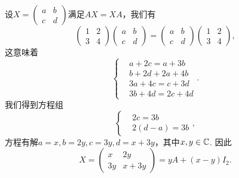 \begin{solution}
  设$X=\begin{pmatrix}
    a & b \\
    c & d
  \end{pmatrix}$满足$AX=XA$，我们有
  \[
    \begin{pmatrix}
      1 & 2 \\
      3 & 4
    \end{pmatrix}\begin{pmatrix}
      a & b \\
      c & d
    \end{pmatrix} = \begin{pmatrix}
      a & b \\
      c & d
    \end{pmatrix}\begin{pmatrix}
      1 & 2 \\
      3 & 4
    \end{pmatrix},
  \]
  这意味着
  \[
    \left\{
      \begin{aligned}
        & a + 2c = a + 3b \\
        & b + 2d + 2a + 4b \\
        & 3a + 4c = c + 3d \\
        & 3b + 4d = 2c + 4d
      \end{aligned}
    \right..
  \]
  我们得到方程组
  \[
    \left\{
      \begin{aligned}
        & 2c = 3b \\
        & 2(d-a) = 3b
      \end{aligned}
    \right.,
  \]
  方程有解$a=x,b=2y,c=3y,d=x+3y$，其中$x,y\in\mathbb C$. 因此
  \[
    X = \begin{pmatrix}
      x & 2y \\
      3y & x + 3y
    \end{pmatrix} = yA + (x-y)I_2.
  \]
\end{solution}

